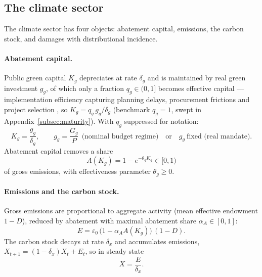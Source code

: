 \documentclass[12pt]{article}
\begin{document}
\subsection{The climate sector}\label{subsec:climate}

The climate sector has four objects: abatement capital, emissions, the carbon
stock, and damages with distributional incidence.

\paragraph{Abatement capital.} Public green capital $K_g$ depreciates at rate
$\delta_g$ and is maintained by real green investment $g_g$, of which only a
fraction $q_g \in (0,1]$ becomes effective capital --- implementation
efficiency capturing planning delays, procurement frictions and project
selection \citep[in the spirit of][and the IMF's Climate-PIMA
framework]{leeperwalkeryang2010}, so $K_g = q_g\, g_g/\delta_g$ (benchmark
$q_g = 1$, swept in Appendix~\ref{subsec:maturity}). With $q_g$ suppressed
for notation:
\begin{equation}
K_g = \frac{g_g}{\delta_g}, \qquad g_g = \frac{G_g}{P}
\ \ \text{(nominal budget regime)} \quad\text{or}\quad g_g\ \text{fixed
(real mandate)}.
\label{eq:Kg}
\end{equation}
Abatement capital removes a share
\begin{equation}
A(K_g) = 1 - e^{-\theta_g K_g}\in[0,1)
\label{eq:abatement}
\end{equation}
of gross emissions, with effectiveness parameter $\theta_g\ge0$.

\paragraph{Emissions and the carbon stock.} Gross emissions are proportional
to aggregate activity (mean effective endowment $1-D$), reduced by abatement
with maximal abatement share $\alpha_A\in[0,1]$:
\begin{equation}
E = \varepsilon_0\,\big(1-\alpha_A A(K_g)\big)\,(1-D).
\label{eq:emissions}
\end{equation}
The carbon stock decays at rate $\delta_x$ and accumulates emissions,
$X_{t+1} = (1-\delta_x)X_t + E_t$, so in steady state
\begin{equation}
X = \frac{E}{\delta_x}.
\label{eq:carbon}
\end{equation}
\end{document}

